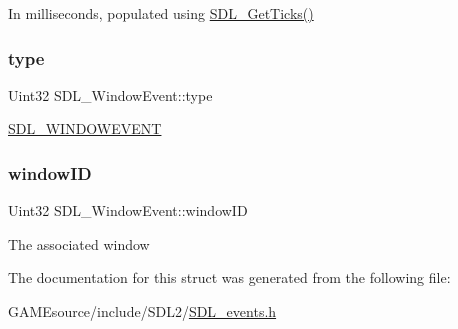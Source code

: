 In milliseconds, populated using \mbox{\hyperlink{_s_d_l__timer_8h_a0b9bc71d6287e0ffafdc3419760fe2b3}{S\+D\+L\+\_\+\+Get\+Ticks()}} \mbox{\label{struct_s_d_l___window_event_a01c8c8fbe8564e690f958d2db560f657}} 
\subsubsection{\texorpdfstring{type}{type}}
{\footnotesize\ttfamily Uint32 S\+D\+L\+\_\+\+Window\+Event\+::type}

\mbox{\hyperlink{_s_d_l__events_8h_a3b589e89be6b35c02e0dd34a55f3fccaa5ff4e41f0d8b5def11cfe6a69ec0b698}{S\+D\+L\+\_\+\+W\+I\+N\+D\+O\+W\+E\+V\+E\+NT}} \mbox{\label{struct_s_d_l___window_event_a4b31796ffc84fbb7f6e9ba33e127619a}} 
\subsubsection{\texorpdfstring{window\+ID}{windowID}}
{\footnotesize\ttfamily Uint32 S\+D\+L\+\_\+\+Window\+Event\+::window\+ID}

The associated window 

The documentation for this struct was generated from the following file\+:\begin{DoxyCompactItemize}
\item 
G\+A\+M\+Esource/include/\+S\+D\+L2/\mbox{\hyperlink{_s_d_l__events_8h}{S\+D\+L\+\_\+events.\+h}}\end{DoxyCompactItemize}
